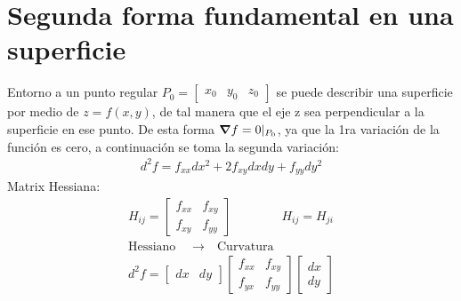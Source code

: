 \documentclass{article}
\begin{document}
\section{Segunda forma fundamental en una superficie }
Entorno a un punto regular $ P_0  = \begin{bmatrix} x_0  & y_0  & z_0  \end{bmatrix} $ se puede describir una superficie por medio de $ z = f\left(x,y\right) $, de tal manera que el eje z sea perpendicular a la superficie en ese punto. De esta forma $ \grad f= 0 |_{P_0 } $, ya que la 1ra variación de la función es cero, a continuación se toma la segunda variación: 
\begin{gather}
  d ^2 f = f _{xx } dx ^2 + 2 f _{xy } dxdy + f _{yy } dy ^2 
\end{gather}
Matrix Hessiana: 
\begin{gather}
  H _{ij }  = \begin{bmatrix}
      f _{xx }  & f _{xy }  \\
      f _{xy }  & f _{yy } 
  \end{bmatrix} \qquad \qquad H _{ij } = H _{ji}\\
  \text{Hessiano } \quad \rightarrow \quad \text{Curvatura}\\
  d ^2f = \begin{bmatrix} dx  & dy  \end{bmatrix} \begin{bmatrix}
      f _{xx }  & f _{xy }  \\
      f _{yx } & f _{yy } 
  \end{bmatrix} \begin{bmatrix}
      dx  \\
      dy   
  \end{bmatrix}   
\end{gather}
\end{document}
